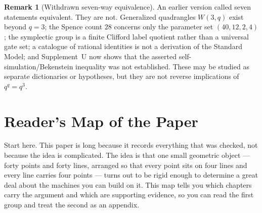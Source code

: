 \documentclass[12pt,a4paper]{article}
\theoremstyle{definition}
\newtheorem{remark}[theorem]{Remark}
\begin{document}
\begin{remark}[Withdrawn seven-way equivalence]
An earlier version called seven statements equivalent.  They are not.
Generalized quadrangles $W(3,q)$ exist beyond $q=3$; the Spence count
$28$ concerns only the parameter set $(40,12,2,4)$; the symplectic
group is a finite Clifford label quotient rather than a universal gate
set; a catalogue of rational identities is not a derivation of the
Standard Model; and Supplement~U now shows that the asserted
self-simulation/Bekenstein inequality was not established.  These may
be studied as separate dictionaries or hypotheses, but they are not
reverse implications of $q^q=q^3$.
\end{remark}

\section*{Reader's Map of the Paper}

\begin{plainbox}
Start here. This paper is long because it records everything that was checked, not
because the idea is complicated. The idea is that one small geometric object --- forty
points and forty lines, arranged so that every point sits on four lines and every line
carries four points --- turns out to be rigid enough to determine a great deal about the
machines you can build on it. This map tells you which chapters carry the argument and
which are supporting evidence, so you can read the first group and treat the second as an
appendix.
\end{plainbox}
\end{document}
